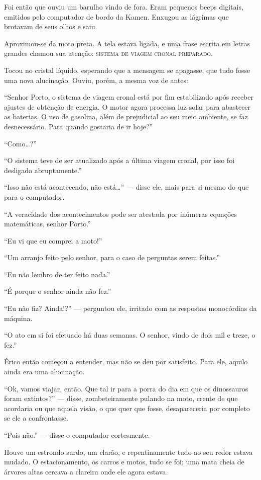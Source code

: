 Foi então que ouviu um barulho vindo de fora. Eram pequenos beeps
digitais, emitidos pelo computador de bordo da Kamen. Enxugou as
lágrimas que brotavam de seus olhos e saiu.

Aproximou-se da moto preta. A tela estava ligada, e uma frase escrita em
letras grandes chamou sua atenção: \textsc{sistema de viagem cronal
preparado}.

Tocou no cristal líquido, esperando que a mensagem se apagasse, que tudo
fosse uma nova alucinação. Ouviu, porém, a mesma voz de antes:

“Senhor Porto, o sistema de viagem cronal está por fim estabilizado após
receber ajustes de obtenção de energia. O motor agora processa luz solar
para abastecer as baterias. O uso de gasolina, além de prejudicial ao
seu meio ambiente, se faz desnecessário. Para quando gostaria de ir
hoje?”

“Como\ldots?”

“O sistema teve de ser atualizado após a última viagem cronal, por isso
foi desligado abruptamente.”

“Isso não está acontecendo, não está\ldots” --- disse ele, mais para si
mesmo do que para o computador.

“A veracidade dos acontecimentos pode ser atestada por inúmeras equações
matemáticas, senhor Porto.”

“Eu vi que eu comprei a moto!”

“Um arranjo feito pelo senhor, para o caso de perguntas serem feitas.”

“Eu não lembro de ter feito nada.”

“É porque o senhor ainda não fez.”

“Eu não fiz? Ainda!?” --- perguntou ele, irritado com as respostas
monocórdias da máquina.

“O ato em si foi efetuado há duas semanas. O senhor, vindo de dois mil e
treze, o fez.”

Érico então começou a entender, mas não se deu por satisfeito. Para ele,
aquilo ainda era uma alucinação.

“Ok, vamos viajar, então. Que tal ir para a porra do dia em que os
dinossauros foram extintos?” --- disse, zombeteiramente pulando na moto,
crente de que acordaria ou que aquela visão, o que quer que fosse,
desapareceria por completo se ele a confrontasse.

“Pois não.” --- disse o computador cortesmente.

Houve um estrondo surdo, um clarão, e repentinamente tudo ao seu redor
estava mudado. O estacionamento, os carros e motos, tudo se foi; uma
mata cheia de árvores altas cercava a clareira onde ele agora estava.

